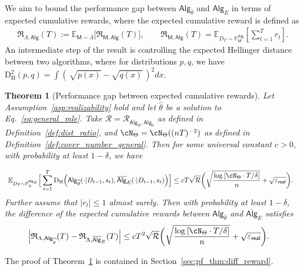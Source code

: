 \documentclass[10pt]{article}
\newtheorem{theorem}{Theorem}
\renewcommand{\epsilon}{\varepsilon}
\newcommand{\<}{\left\langle}
\renewcommand{\>}{\right\rangle}
\newcommand{\paren}[1]{{\left( #1 \right)}}
\newcommand{\brac}[1]{{\left[ #1 \right]}}
\newcommand{\E}{\mathbb{E}}
\renewcommand{\P}{\mathbb{P}}
\newcommand{\inst}{{\mathsf{M}}}
\newcommand{\HelDs}{{\mathrm{D}^2_{\mathrm{H}}}}
\newcommand{\HelD}{{\mathrm{D}_{\mathrm{H}}}}
\newcommand{\state}{{s}}
\newcommand{\reward}{{r}}
\newcommand{\totlen}{{T}}
\newcommand{\sAlg}{{\mathsf{Alg}}}
\newcommand{\osAlg}{\overline{\mathsf{Alg}}}
\newcommand{\dset}{{D}}
\newcommand{\Numobs}{{n}}
\newcommand{\Parspace}{{\Theta}}
\newcommand{\EstPar}{{\widehat{\theta}}}
\newcommand{\prior}{{\Lambda}}
\newcommand{\shortexp}{{E}}
\newcommand{\geneps}{{\epsilon}_{\sf real}}
\newcommand{\totreward}{{\mathfrak{R}}}
\newcommand{\distratio}{{\mathcal{R}}}
\begin{document}
We aim to bound the performance gap between $\sAlg_{\EstPar}$ and $\sAlg_\shortexp$ in terms of expected cumulative rewards, where the expected cumulative reward is defined as 
\begin{align*}
\textstyle \totreward_{\prior,\sAlg}(\totlen)
:= \E_{\inst\sim\prior}\big[\totreward_{\inst,\sAlg}(\totlen) \big],~~~~~~~~~ \totreward_{\inst,\sAlg}(\totlen) = \E_{\dset_{\totlen} \sim\P^{\sAlg}_\inst}[\sum_{t=1}^\totlen \reward_t].
\end{align*}
An intermediate step of the result is controlling the expected Hellinger distance between two algorithms, where for distributions $p, q$, we have $\HelDs(p, q) = \int (\,\sqrt{p(x)} - \sqrt{q(x)} \,)^2 d x$. 

\begin{theorem}[Performance gap between expected cumulative rewards]\label{thm:diff_reward} Let Assumption~\ref{asp:realizability} hold and let $\EstPar$ be a solution to Eq.~\eqref{eq:general_mle}. Take $\distratio = \distratio_{\osAlg_\shortexp,\sAlg_0}$ as defined in Definition~\ref{def:dist_ratio}, and $\cN_{\Parspace} = \cN_{\Parspace}((\Numobs\totlen)^{-2})$  as defined in Definition~\ref{def:cover_number_general}. Then for some universal constant $c>0$, with probability at least $1-\delta$, we have 


\begin{align}\label{eqn:Hellinger-bound-main-theorem}
&~ \E_{\dset_\totlen\sim \P^{\sAlg_\shortexp}_\prior}\Big[ \sum_{t=1}^\totlen \HelD \paren{  \sAlg_{{\EstPar}}(\cdot|\dset_{t-1},\state_t ),\osAlg_{\shortexp}(\cdot|\dset_{t-1},\state_t )} \Big] 
\le c {\totlen} \sqrt{\distratio}
\bigg(\sqrt{\frac{\log \brac{ \cN_{\Parspace} \cdot 
 \totlen/\delta } }{n}} +  \sqrt{\geneps}\bigg).
\end{align} 
Further assume that $|\reward_t| \leq 1$ almost surely. Then with probability at least $1-\delta$, the difference of the expected cumulative rewards between $\sAlg_\EstPar$ and $\osAlg_\shortexp$ satisfies
\begin{align}\label{eqn:reward-bound-main-theorem}
\Big|\totreward_{\prior,\sAlg_\EstPar}(\totlen)-\totreward_{\prior,\osAlg_\shortexp}(\totlen)\Big|
&\leq 
c \totlen^2 \sqrt{\distratio} \bigg(\sqrt{\frac{\log \brac{ \cN_{\Parspace} \cdot 
 \totlen/\delta } }{n}} +  \sqrt{\geneps}\bigg).
\end{align}
\end{theorem}

The proof of Theorem~\ref{thm:diff_reward} is contained in Section~\ref{sec:pf_thm:diff_reward}.
\end{document}
